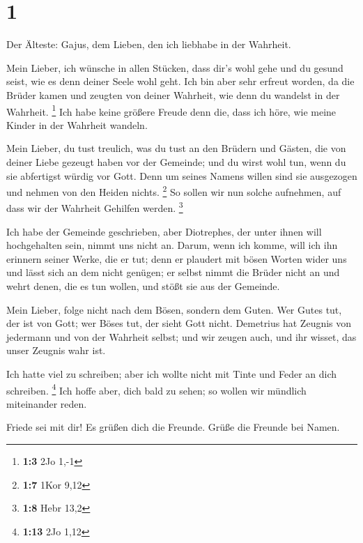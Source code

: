 \hypertarget{section}{%
\section{1}\label{section}}

 Der Älteste: Gajus, dem Lieben, den ich liebhabe in der
Wahrheit.

 Mein Lieber, ich wünsche in allen Stücken, dass dir's wohl
gehe und du gesund seist, wie es denn deiner Seele wohl geht.
 Ich bin aber sehr erfreut worden, da die Brüder kamen und
zeugten von deiner Wahrheit, wie denn du wandelst in der Wahrheit.
\footnote{\textbf{1:3} 2Jo 1,-1}  Ich habe keine größere
Freude denn die, dass ich höre, wie meine Kinder in der Wahrheit
wandeln.

 Mein Lieber, du tust treulich, was du tust an den Brüdern
und Gästen,  die von deiner Liebe gezeugt haben vor der
Gemeinde; und du wirst wohl tun, wenn du sie abfertigst würdig vor Gott.
 Denn um seines Namens willen sind sie ausgezogen und nehmen
von den Heiden nichts. \footnote{\textbf{1:7} 1Kor 9,12}  So
sollen wir nun solche aufnehmen, auf dass wir der Wahrheit Gehilfen
werden. \footnote{\textbf{1:8} Hebr 13,2}

 Ich habe der Gemeinde geschrieben, aber Diotrephes, der
unter ihnen will hochgehalten sein, nimmt uns nicht an. 
Darum, wenn ich komme, will ich ihn erinnern seiner Werke, die er tut;
denn er plaudert mit bösen Worten wider uns und lässt sich an dem nicht
genügen; er selbst nimmt die Brüder nicht an und wehrt denen, die es tun
wollen, und stößt sie aus der Gemeinde.

 Mein Lieber, folge nicht nach dem Bösen, sondern dem
Guten. Wer Gutes tut, der ist von Gott; wer Böses tut, der sieht Gott
nicht.  Demetrius hat Zeugnis von jedermann und von der
Wahrheit selbst; und wir zeugen auch, und ihr wisset, das unser Zeugnis
wahr ist.

 Ich hatte viel zu schreiben; aber ich wollte nicht mit
Tinte und Feder an dich schreiben. \footnote{\textbf{1:13} 2Jo 1,12}
 Ich hoffe aber, dich bald zu sehen; so wollen wir mündlich
miteinander reden.

 Friede sei mit dir! Es grüßen dich die Freunde. Grüße die
Freunde bei Namen.
